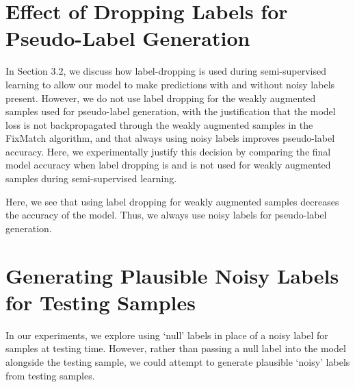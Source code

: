 \documentclass[10pt,twocolumn,letterpaper]{article}
\begin{document}
\section{Effect of Dropping Labels for Pseudo-Label Generation}

In Section 3.2, we discuss how label-dropping is used during semi-supervised learning to allow our model to make predictions with and without noisy labels present. However, we do not use label dropping for the weakly augmented samples used for pseudo-label generation, with the justification that the model loss is not backpropagated through the weakly augmented samples in the FixMatch algorithm, and that always using noisy labels improves pseudo-label accuracy. Here, we experimentally justify this decision by comparing the final model accuracy when label dropping is and is not used for weakly augmented samples during semi-supervised learning.

\begin{table}[ht!]
    \begin{center}
    \end{center}
    \caption{\small Effect of Label Dropping on Final Accuracy for Asym. 40\% noise on CIFAR10} 
    \label{tab:label_dropping_ablation}
\end{table}

Here, we see that using label dropping for weakly augmented samples decreases the accuracy of the model. Thus, we always use noisy labels for pseudo-label generation.

\section{Generating Plausible Noisy Labels for Testing Samples}

In our experiments, we explore using `null' labels in place of a noisy label for samples at testing time. However, rather than passing a null label into the model alongside the testing sample, we could attempt to generate plausible `noisy' labels from testing samples.
\end{document}

